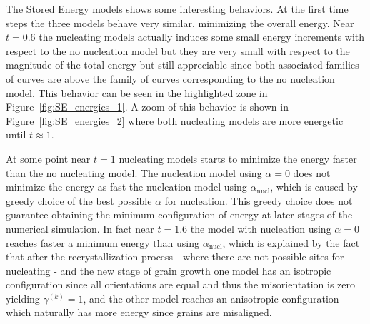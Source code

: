 The Stored Energy models shows some interesting behaviors. 
At the first time steps the three models behave very similar, minimizing the overall energy. Near $t = 0.6$ the nucleating models actually induces some small energy increments with respect to the no nucleation model but they are very small with respect to the magnitude of the total energy but still appreciable since both associated families of curves are above the family of curves corresponding to the no nucleation model. 
This behavior can be seen in the highlighted zone in Figure~\ref{fig:SE_energies_1}. 
A zoom of this behavior is shown in Figure~\ref{fig:SE_energies_2} where both nucleating models are more energetic until $t \approx 1$.

At some point near $t = 1$ nucleating models starts to minimize the energy faster than the no nucleating model. 
The nucleation model using $\alpha = 0$ does not minimize the energy as fast the nucleation model using $\alpha_{\text{nucl}}$, which is caused by greedy choice of the best possible $\alpha$ for nucleation. 
This greedy choice does not guarantee obtaining the minimum configuration of energy at later stages of the numerical simulation. 
In fact near $t = 1.6$ the model with nucleation using $\alpha = 0$ reaches faster a minimum energy than using $\alpha_{\text{nucl}}$, which is explained by the fact that after the recrystallization process - where there are not possible sites for nucleating - and the new stage of grain growth one model has an isotropic configuration since all orientations are equal and thus the misorientation is zero yielding $\gamma^{(k)} = 1$, and the other model reaches an anisotropic configuration which naturally has more energy since grains are misaligned.

